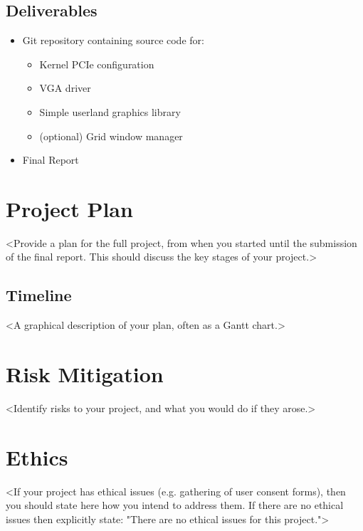 \subsection{Deliverables}

\begin{itemize}
    \item{Git repository containing source code for:}
          \begin{itemize}
              \item{Kernel PCIe configuration}
              \item{VGA driver}
              \item{Simple userland graphics library}
              \item{(optional) Grid window manager}
          \end{itemize}
    \item{Final Report}
\end{itemize}


%
%
\section{Project Plan}

<Provide a plan for the full project, from when you started until the submission of the final report. This should discuss the key stages of your project.>

\subsection{Timeline}

<A graphical description of your plan, often as a Gantt chart.>




%
%
\section{Risk Mitigation}

<Identify risks to your project, and what you would do if they arose.>


%
%
\section{Ethics}

<If your project has ethical issues (e.g. gathering of user consent forms), then you should state here how you intend to address them. If there are no ethical issues then explicitly state: "There are no ethical issues for this project.">